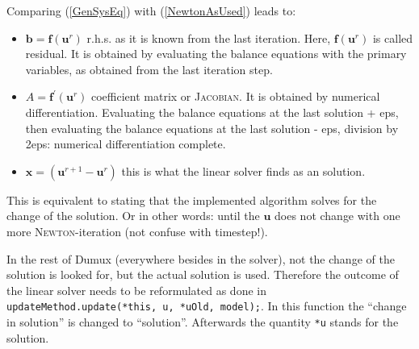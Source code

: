 Comparing (\ref{GenSysEq}) with (\ref{NewtonAsUsed}) leads to:
\begin{itemize}
\item $\textbf{b} = \textbf{f}(\textbf{u}^r)$ r.h.s. as it is known from the last iteration. Here, $\textbf{f}(\textbf{u}^r)$ is called residual. It is obtained by evaluating the balance equations with the primary variables, as obtained from the last iteration step.
\item $A=\textbf{f}^{\prime}(\textbf{u}^r)$ coefficient matrix or \textsc{Jacobian}. It is obtained by numerical differentiation. Evaluating the balance equations at the last solution + eps, then evaluating the balance equations at the last solution - eps, division by 2eps: numerical differentiation complete.
\item $\textbf{x} = (\textbf{u}^{r+1} - \textbf{u}^{r})$ this is what the linear solver finds as an solution. 
\end{itemize}

This is equivalent to stating that the implemented algorithm solves for the change of the solution. Or in other words: until the $\textbf{u}$ does not change with one more \textsc{Newton-}iteration (not confuse with timestep!).

In the rest of Dumux (everywhere besides in the solver), not the change of the solution is looked for, but the actual solution is used. Therefore the outcome of the linear solver needs to be reformulated as done in \verb+updateMethod.update(*this, u, *uOld, model);+. In this function the ``change in solution'' is changed to ``solution''. Afterwards the quantity \verb+*u+ stands for the solution.
